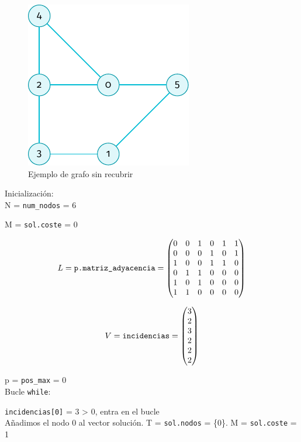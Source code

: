 \documentclass[11pt]{article}
\begin{document}
\begin{figure}[H]
	\caption{Ejemplo de grafo sin recubrir}
	\centering \includegraphics{./img/grafo-ejemplo-sin-recubrir.pdf}
\end{figure}

Inicialización:\\
N = \verb|num_nodos| = 6

M = \verb|sol.coste| = 0

$$  L = \verb|p.matriz_adyacencia| = 
\begin{pmatrix}
	0 & 0 & 1 & 0 & 1 & 1 \\
	0 & 0 & 0 & 1 & 0 & 1 \\
	1 & 0 & 0 & 1 & 1 & 0 \\
	0 & 1 & 1 & 0 & 0 & 0 \\
	1 & 0 & 1 & 0 & 0 & 0 \\
	1 & 1 & 0 & 0 & 0 & 0
\end{pmatrix}$$

$$ V = \verb|incidencias| = 
\begin{pmatrix}
	3 \\
	2 \\
	3 \\
	2 \\
	2 \\
	2 
\end{pmatrix}$$

p = \verb|pos_max| = 0\\

Bucle \verb|while|:

\verb|incidencias[0]| = 3 > 0, entra en el bucle\\
Añadimos el nodo 0 al vector solución. T = \verb|sol.nodos| = \{0\}. 
M = \verb|sol.coste| = 1\\
\end{document}
